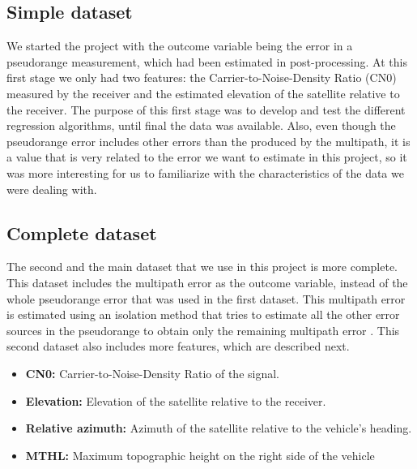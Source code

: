 \documentclass[a4paper, report, oneside, UKenglish]{memoir}
\begin{document}
\subsection{Simple dataset}
We started the project with the outcome variable being the error in a pseudorange measurement, which had been estimated in post-processing. At this first stage we only had two features: the Carrier-to-Noise-Density Ratio (CN0) measured by the receiver and the estimated elevation of the satellite relative to the receiver. The purpose of this first stage was to develop and test the different regression algorithms, until final the data was available. Also, even though the pseudorange error includes other errors than the produced by the multipath, it is a value that is very related to the error we want to estimate in this project, so it was more interesting for us to familiarize with the characteristics of the data we were dealing with.





\subsection{Complete dataset}
The second and the main dataset that we use in this project is more complete. This dataset includes the multipath error as the outcome variable, instead of the whole pseudorange error that was used in the first dataset. This multipath error is estimated using an isolation method that tries to estimate all the other error sources in the pseudorange to obtain only the remaining multipath error \cite{matera_chatacterization_2019}. This second dataset also includes more features, which are described next.

\begin{itemize}
    \item \textbf{CN0:} Carrier-to-Noise-Density Ratio of the signal.
    \item \textbf{Elevation:} Elevation of the satellite relative to the receiver.
    \item \textbf{Relative azimuth:} Azimuth of the satellite relative to the vehicle's heading.
    \item \textbf{MTHL:} Maximum topographic height on the right side of the vehicle
\end{itemize}



\end{document}
